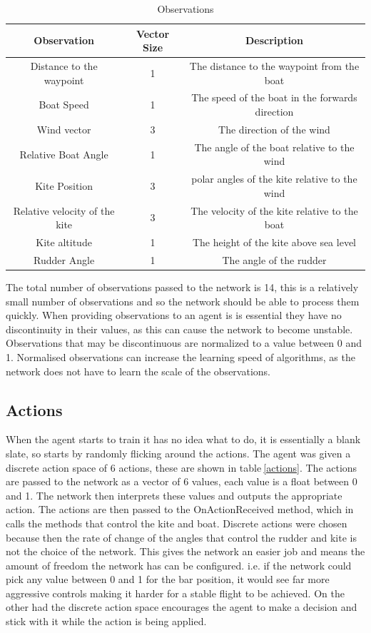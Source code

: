 \begin{table}[h]
    \centering
    \begin{tabular}{c|c|c}
        Observation & Vector Size & Description \\
        \midrule
        Distance to the waypoint & 1 & The distance to the waypoint from the boat \\
        Boat Speed & 1 & The speed of the boat in the forwards direction \\
        Wind vector & 3 & The direction of the wind \\
        Relative Boat Angle & 1 & The angle of the boat relative to the wind \\
        Kite Position & 3 & polar angles of the kite relative to the wind\\
        Relative velocity of the kite & 3 & The velocity of the kite relative to the boat \\
        Kite altitude & 1 & The height of the kite above sea level \\
        Rudder Angle & 1 & The angle of the rudder \\

        \hline
    \end{tabular}
    \caption{Observations}\label{observations}
\end{table}

The total number of observations passed to the network is 14, this is a relatively small number of observations and so the network should be able to process them quickly. When providing observations to an agent is is essential they have no discontinuity in their values, as this can cause the network to become unstable. Observations that may be discontinuous are normalized to a value between 0 and 1. Normalised observations can increase the learning speed of algorithms, as the network does not have to learn the scale of the observations.

\subsection{Actions}
When the agent starts to train it has no idea what to do, it is essentially a blank slate, so starts by randomly flicking around the actions. The agent was given a discrete action space of 6 actions, these are shown in table$~$\ref{actions}. The actions are passed to the network as a vector of 6 values, each value is a float between 0 and 1. The network then interprets these values and outputs the appropriate action. The actions are then passed to the OnActionReceived method, which in calls the methods that control the kite and boat. Discrete actions were chosen because then the rate of change of the angles that control the rudder and kite is not the choice of the network. This gives the network an easier job and means the amount of freedom the network has can be configured. i.e. if the network could pick any value between 0 and 1 for the bar position, it would see far more aggressive controls making it harder for a stable flight to be achieved. On the other had the discrete action space encourages the agent to make a decision and stick with it while the action is being applied. 

